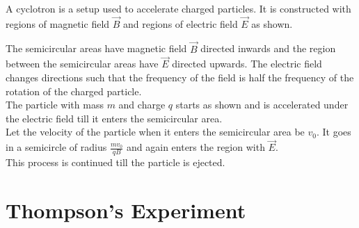 \documentclass[fleqn, a4paper, 12pt, twoside]{article}
\theoremstyle{definition}
\theoremstyle{theorem}
\begin{document}
A cyclotron is a setup used to accelerate charged particles.
It is constructed with regions of magnetic field $\overrightarrow{B}$ and regions of electric field $\overrightarrow{E}$ as shown.
\begin{figure}[H]
\end{figure}
The semicircular areas have magnetic field $\overrightarrow{B}$ directed inwards and the region between the semicircular areas have $\overrightarrow{E}$ directed upwards.
The electric field changes directions such that the frequency of the field is half the frequency of the rotation of the charged particle.\\
The particle with mass $m$ and charge $q$ starts as shown and is accelerated under the electric field till it enters the semicircular area.\\
Let the velocity of the particle when it enters the semicircular area be $v_0$.
It goes in a semicircle of radius $\frac{m v_0}{q B}$ and again enters the region with $\overrightarrow{E}$.\\
This process is continued till the particle is ejected.

\section{Thompson's Experiment}
\end{document}
